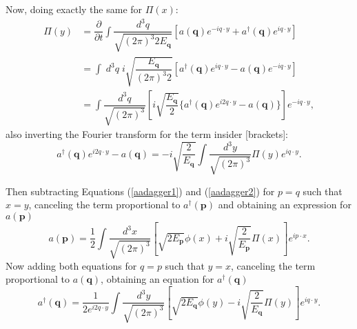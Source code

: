 Now, doing exactly the same for $\Pi(x)$:
\begin{align*}
    \Pi(y) &= \dfrac{\partial}{\partial t} \int \dfrac{d^3q}{\sqrt{(2\pi)^{3}2E_{\bm{q}}}} [a(\bm{q})e^{-iq\cdot y} + a^{\dagger}(\bm{q})e^{iq\cdot y}] \\
    &=  \int \; d^3q \; i\sqrt{\dfrac{E_{\bm{q}}}{(2\pi)^{3}2}} [a^{\dagger}(\bm{q})e^{iq\cdot y} - a(\bm{q})e^{-iq\cdot y}] \\
    &=  \int \dfrac{d^3q}{\sqrt{(2\pi)^{3}}} \left[ i\sqrt{\dfrac{E_{\bm{q}}}{2}} \{a^{\dagger}(\bm{q})e^{i2q\cdot y} - a(\bm{q})\} \right] e^{-iq\cdot y},
\end{align*}
also inverting the Fourier transform for the term insider [brackets]:
\begin{equation}
\label{aadagger2}
    a^{\dagger}(\bm{q})e^{i2q\cdot y} - a(\bm{q}) = -i\sqrt{\dfrac{2}{E_{\bm{q}}}} \int \dfrac{d^3y}{\sqrt{(2\pi)^3}}\Pi(y)e^{iq\cdot y}.
\end{equation}

Then subtracting Equations (\ref{aadagger1}) and (\ref{aadagger2}) for $p = q$ such that $x = y$, canceling the term proportional to $a^{\dagger}(\bm{p})$ and obtaining an expression for $a(\bm{p})$
\begin{equation*}
    a(\bm{p}) = \dfrac{1}{2} \int \dfrac{d^3x}{\sqrt{(2\pi)^3}} \left[ \sqrt{2E_{\bm{p}}}\phi(x) + i\sqrt{\dfrac{2}{E_{\bm{p}}}}\Pi(x) \right] e^{ip\cdot x}.
\end{equation*}
Now adding both equations for $q = p$ such that $y = x$, canceling the term proportional to $a(\bm{q})$, obtaining an equation for $a^{\dagger}(\bm{q})$
\begin{equation*}
    a^{\dagger}(\bm{q}) = \dfrac{1}{2e^{i2q\cdot y}} \int \dfrac{d^3y}{\sqrt{(2\pi)^3}} \left[ \sqrt{2E_{\bm{q}}}\phi(y) - i\sqrt{\dfrac{2}{E_{\bm{q}}}}\Pi(y) \right] e^{iq\cdot y}.
\end{equation*}

